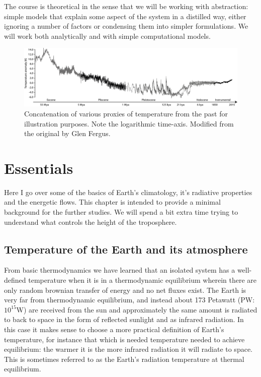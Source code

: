 \documentclass[12pt]{book}
\begin{document}
The course is theoretical in the sense that we will be working with abstraction: simple models that explain some aspect of the system in a distilled way, either ignoring a number of factors or condensing them into simpler formulations. We will work both analytically and with simple computational models. 


\begin{figure}
\begin{center}
\includegraphics[width=17 cm]{../external_figures/Paleo_temperature_timeseries}
\end{center}
\caption{ Concatenation of various proxies of temperature from the past for illustration purposes. Note the logarithmic time-axis. Modified from the original by Glen Fergus. } 
\label{fig:Paleo_temperature_timeseries}
\end{figure}

\mainmatter
\chapter{Essentials}
\label{chapter:essentials}
Here I go over some of the basics of Earth's climatology, it's radiative properties and the energetic flows. This chapter is intended to provide a minimal background for the further studies. We will spend a bit extra time trying to understand what controls the height of the troposphere. 

\section{Temperature of the Earth and its atmosphere}
From basic thermodynamics we have learned that an isolated system has a well-defined temperature when it is in a thermodynamic equilibrium wherein there are only random brownian transfer of energy and no net fluxes exist. The Earth is very far from thermodynamic equilibrium, and instead about 173 Petawatt (PW: $10^{15}$W) are received from the sun and approximately the same amount is radiated to back to space in the form of reflected sunlight and as infrared radiation. In this case it makes sense to choose a more practical definition of Earth's temperature, for instance that which is needed temperature needed to achieve equilibrium: the warmer it is the more infrared radiation it will radiate to space. This is sometimes referred to as the Earth's radiation temperature at thermal equilibrium.
\end{document}
